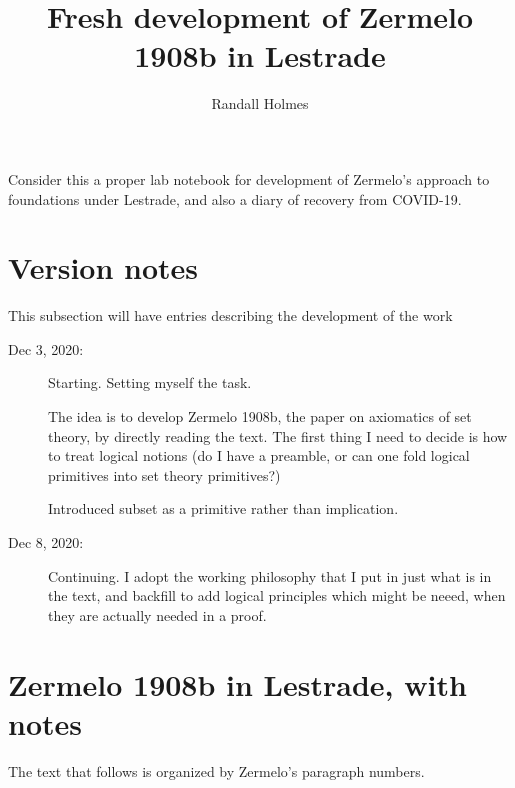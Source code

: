 \documentclass[12pt]{article}
\title{Fresh development of Zermelo 1908b in Lestrade}
\author{Randall Holmes}
\begin{document}
\maketitle

Consider this a proper lab notebook for development of Zermelo's approach to foundations under Lestrade, and also a diary of recovery from COVID-19.

\section{Version notes}

This subsection will have entries describing the development of the work

\begin{description}

\item[Dec 3, 2020:]  Starting.  Setting myself the task.

The idea is to develop Zermelo 1908b, the paper on axiomatics of set theory, by directly reading the text.  The first thing I need to decide is how to treat logical notions
(do I have a preamble, or can one fold logical primitives into set theory primitives?)

Introduced subset as a primitive rather than implication.

\item[Dec 8, 2020:]  Continuing.  I adopt the working philosophy that I put in just what is in the text, and backfill to add logical principles which might be neeed, when they are actually needed in a proof.

\end{description}

\section{Zermelo 1908b in Lestrade, with notes}

The text that follows is organized by Zermelo's paragraph numbers.
\end{document}
